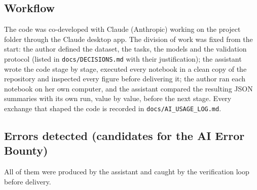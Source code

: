 
\subsection*{Workflow}

The code was co-developed with Claude (Anthropic) working on the project folder through the Claude
desktop app. The division of work was fixed from the start: the author defined the dataset, the tasks,
the models and the validation protocol (listed in \texttt{docs/DECISIONS.md} with their justification);
the assistant wrote the code stage by stage, executed every notebook in a clean copy of the repository
and inspected every figure before delivering it; the author ran each notebook on her own computer, and
the assistant compared the resulting JSON summaries with its own run, value by value, before the next
stage. Every exchange that shaped the code is recorded in \texttt{docs/AI\_USAGE\_LOG.md}.

\subsection*{Errors detected (candidates for the AI Error Bounty)}

All of them were produced by the assistant and caught by the verification loop before delivery.

